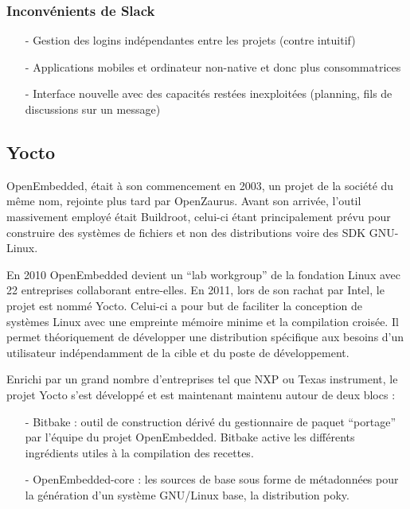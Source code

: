\subsubsection{Inconvénients de Slack}

\begin{itemize}
    \item[-] Gestion des logins indépendantes entre les projets (contre intuitif)
    \item[-] Applications mobiles et ordinateur non-native et donc plus consommatrices
    \item[-] Interface nouvelle avec des capacités restées inexploitées (planning, fils de discussions
    sur un message)
\end{itemize}

\subsection{Yocto}

OpenEmbedded, était à son commencement en 2003, un projet de la société du même
nom, rejointe plus tard par OpenZaurus. Avant son arrivée, l'outil massivement employé
était Buildroot, celui-ci étant principalement prévu pour construire des systèmes de fichiers
et non des distributions voire des SDK GNU-Linux. \medskip

En 2010 OpenEmbedded devient un “lab workgroup” de la fondation Linux avec 22
entreprises collaborant entre-elles. En 2011, lors de son rachat par Intel, le projet est
nommé Yocto. Celui-ci a pour but de faciliter la conception de systèmes Linux avec une
empreinte mémoire minime et la compilation croisée. Il permet théoriquement de
développer une distribution spécifique aux besoins d’un utilisateur indépendamment de la
cible et du poste de développement. \medskip

\clearpage

Enrichi par un grand nombre d’entreprises tel que NXP ou Texas instrument, le projet
Yocto s’est développé et est maintenant maintenu autour de deux blocs :

\begin{itemize}
    \item[-] Bitbake : outil de construction dérivé du gestionnaire de paquet “portage” par
    l’équipe du projet OpenEmbedded. Bitbake active les différents ingrédients utiles à
    la compilation des recettes.
    \item[-] OpenEmbedded-core : les sources de base sous forme de métadonnées pour la
    génération d’un système GNU/Linux base, la distribution poky.
\end{itemize}

